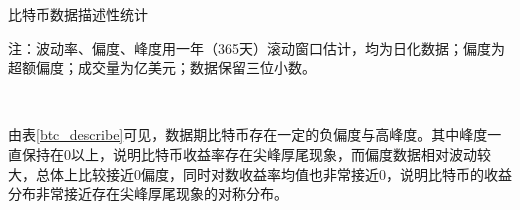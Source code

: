 \begin{threeparttable}[H]
    
    \centering
    \caption{比特币数据描述性统计}
    \label{btc_describe}
    
    \begin{tablenotes}
        \footnotesize
        \item 注：波动率、偏度、峰度用一年（365天）滚动窗口估计，均为日化数据；偏度为超额偏度；成交量为亿美元；数据保留三位小数。
    \end{tablenotes}
\end{threeparttable}


~\\
\par{

由表\ref{btc_describe}可见，数据期比特币存在一定的负偏度与高峰度。其中峰度一直保持在0以上，说明比特币收益率存在尖峰厚尾现象，而偏度数据相对波动较大，总体上比较接近0偏度，同时对数收益率均值也非常接近0，说明比特币的收益分布非常接近存在尖峰厚尾现象的对称分布。
}
